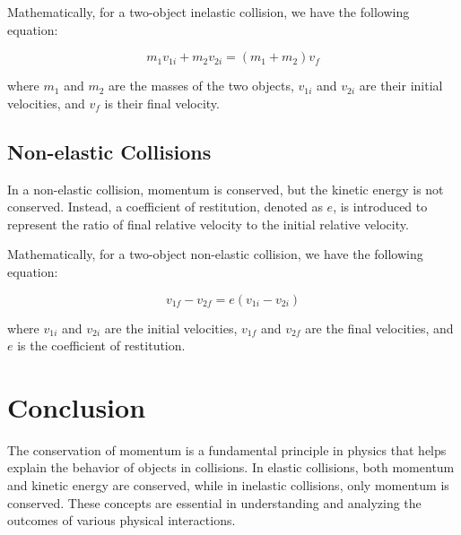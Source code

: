 \documentclass{article}
\begin{document}
Mathematically, for a two-object inelastic collision, we have the following equation:~\cite{arie}

\begin{equation}
m_1 v_{1i} + m_2 v_{2i} = (m_1 + m_2) v_f
\end{equation}

where $m_1$ and $m_2$ are the masses of the two objects, $v_{1i}$ and $v_{2i}$ are their initial velocities, and $v_f$ is their final velocity.

\subsection{Non-elastic Collisions}
In a non-elastic collision, momentum is conserved, but the kinetic energy is not conserved. Instead, a coefficient of restitution, denoted as $e$, is introduced to represent the ratio of final relative velocity to the initial relative velocity.

Mathematically, for a two-object non-elastic collision, we have the following equation:~\cite{arie}

\begin{equation}
v_{1f} - v_{2f} = e(v_{1i} - v_{2i})
\end{equation}

where $v_{1i}$ and $v_{2i}$ are the initial velocities, $v_{1f}$ and $v_{2f}$ are the final velocities, and $e$ is the coefficient of restitution.






\section{Conclusion}
The conservation of momentum is a fundamental principle in physics that helps explain the behavior of objects in collisions. In elastic collisions, both momentum and kinetic energy are conserved, while in inelastic collisions, only momentum is conserved. These concepts are essential in understanding and analyzing the outcomes of various physical interactions.





\end{document}
